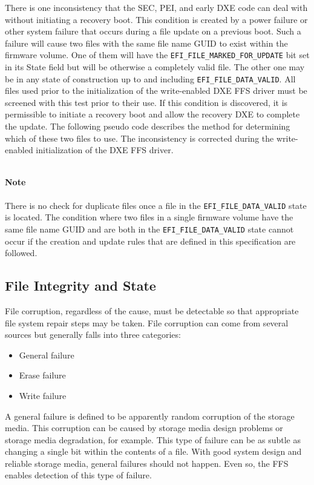 There is one inconsistency that the SEC, PEI, and early DXE code can deal with without initiating a
recovery boot. This condition is created by a power failure or other system failure that occurs during
a file update on a previous boot. Such a failure will cause two files with the same file name GUID to
exist within the firmware volume. One of them will have the \verb|EFI_FILE_MARKED_FOR_UPDATE|
bit set in its State field but will be otherwise a completely valid file. The other one may be in any
state of construction up to and including \verb|EFI_FILE_DATA_VALID|. All files used prior to the
initialization of the write-enabled DXE FFS driver must be screened with this test prior to their use.
If this condition is discovered, it is permissible to initiate a recovery boot and allow the recovery
DXE to complete the update.
The following pseudo code describes the method for determining which of these two files to use.
The inconsistency is corrected during the write-enabled initialization of the DXE FFS driver.

\inputminted{c}{code/architecture-traversal-and-file-access.c}\label{code:architecture-traversal-and-file-access}


\paragraph{Note} There is no check for duplicate files once a file in the \verb|EFI_FILE_DATA_VALID| state is located.
The condition where two files in a single firmware volume have the same file name GUID and are
both in the \verb|EFI_FILE_DATA_VALID| state cannot occur if the creation and update rules that are
defined in this specification are followed.

\subsection{File Integrity and State}
File corruption, regardless of the cause, must be detectable so that appropriate file system repair
steps may be taken. File corruption can come from several sources but generally falls into three
categories:
\begin{itemize}
	\item General failure
	\item Erase failure
	\item Write failure
\end{itemize}

A general failure is defined to be apparently random corruption of the storage media. This
corruption can be caused by storage media design problems or storage media degradation, for
example. This type of failure can be as subtle as changing a single bit within the contents of a file.
With good system design and reliable storage media, general failures should not happen. Even so,
the FFS enables detection of this type of failure.

